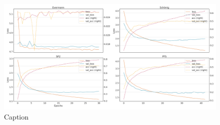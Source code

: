 \begin{figure}[!htb]
    \centering
    \includegraphics[width=\textwidth]{gfx/bpic2015_3/windowed_loss_acc_curve.png}
    \caption{Caption}
    \label{fig:my_label}
\end{figure}
\FloatBarrier

